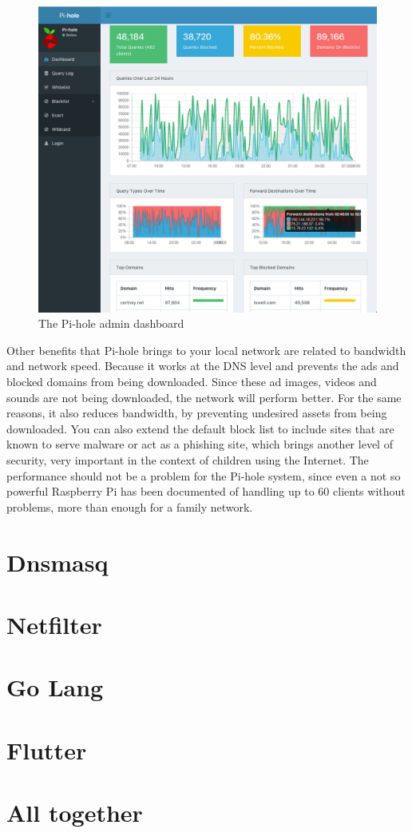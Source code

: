 \begin{figure}[th]
\centering
\includegraphics[width=1\textwidth]{Figures/pihole-admin}
\decoRule
\caption{The Pi-hole admin dashboard}
\label{fig:circle}
\end{figure}

Other benefits that Pi-hole brings to your local network are related to bandwidth and network speed. Because it works at the DNS level and prevents the ads and blocked domains from being downloaded. Since these ad images, videos and sounds are not being downloaded, the network will perform better. For the same reasons, it also reduces bandwidth, by preventing undesired assets from being downloaded. You can also extend the default block list to include sites that are known to serve malware or act as a phishing site, which brings another level of security, very important in the context of children using the Internet. The performance should not be a problem for the Pi-hole system, since even a not so powerful Raspberry Pi has been documented of handling up to 60 clients without problems, more than enough for a family network. \parencite{salmela20177things}

\section{Dnsmasq}

\section{Netfilter}

\section{Go Lang}

\section{Flutter}

\section{All together}

